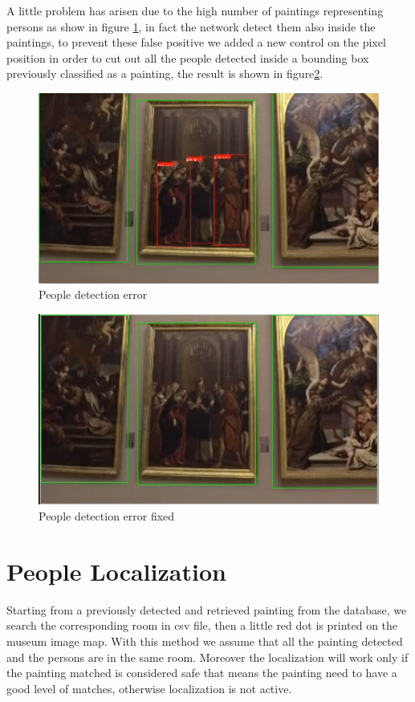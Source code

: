 \documentclass[conference]{IEEEtran}
\begin{document}
A little problem has arisen due to the high number of paintings representing persons as show in figure \ref{fig_People_detection_error}, in fact the network detect them also inside the paintings, to prevent these false positive we added a new control on the pixel position in order to cut out all the people detected inside a bounding box previously classified as a painting, the result is shown in figure\ref{fig_People_detection_error_fixed}.\\

\begin{figure}[htbp]
\centerline{\includegraphics[width=0.8\columnwidth]{../people_detection/people_error.png}}
\caption{People detection error}
\label{fig_People_detection_error}
\end{figure}

\begin{figure}[htbp]
\centerline{\includegraphics[width=0.8\columnwidth]{../people_detection/people_error_fixed.png}}
\caption{People detection error fixed}
\label{fig_People_detection_error_fixed}
\end{figure}

\bigskip

\section{People Localization}
Starting from a previously detected and retrieved painting from the database, we search the corresponding room in csv file, then a little red dot is printed on the museum image map. With this method we assume that all the painting detected and the persons are in the same room.
Moreover the localization will work only if the painting matched is considered safe that means the painting need to have a good level of matches, otherwise localization is not active.\\
\end{document}
